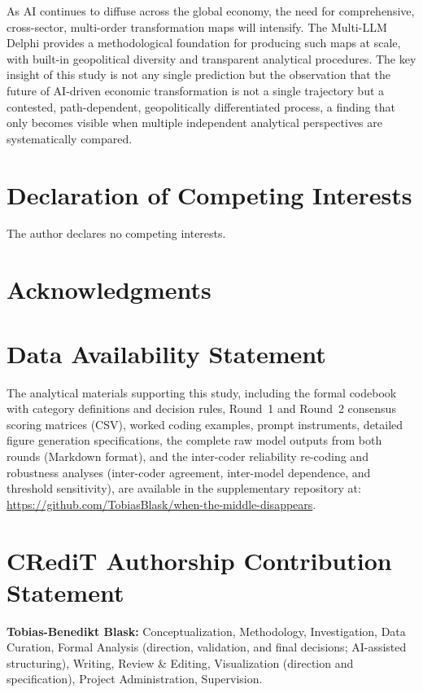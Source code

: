 \documentclass[preprint,review,12pt]{elsarticle}
\begin{document}
As AI continues to diffuse across the global economy, the need for comprehensive, cross-sector, multi-order transformation maps will intensify. The Multi-LLM Delphi provides a methodological foundation for producing such maps at scale, with built-in geopolitical diversity and transparent analytical procedures. The key insight of this study is not any single prediction but the observation that the future of AI-driven economic transformation is not a single trajectory but a contested, path-dependent, geopolitically differentiated process, a finding that only becomes visible when multiple independent analytical perspectives are systematically compared.


\section*{Declaration of Competing Interests}

The author declares no competing interests.

\section*{Acknowledgments}

\section*{Data Availability Statement}

The analytical materials supporting this study, including the formal codebook with category definitions and decision rules, Round~1 and Round~2 consensus scoring matrices (CSV), worked coding examples, prompt instruments, detailed figure generation specifications, the complete raw model outputs from both rounds (Markdown format), and the inter-coder reliability re-coding and robustness analyses (inter-coder agreement, inter-model dependence, and threshold sensitivity), are available in the supplementary repository at: \url{https://github.com/TobiasBlask/when-the-middle-disappears}.

\section*{CRediT Authorship Contribution Statement}

\textbf{Tobias-Benedikt Blask:} Conceptualization, Methodology, Investigation, Data Curation, Formal Analysis (direction, validation, and final decisions; AI-assisted structuring), Writing, Review \& Editing, Visualization (direction and specification), Project Administration, Supervision.
\end{document}
